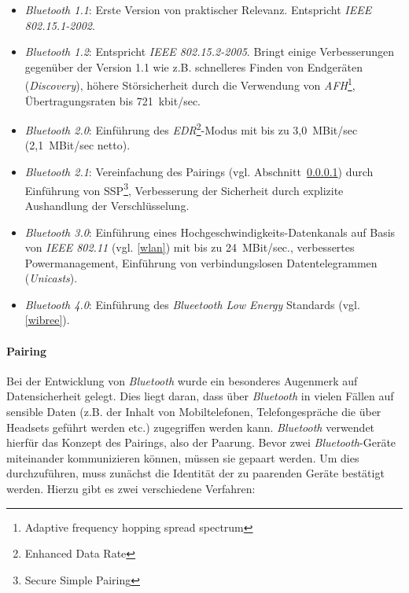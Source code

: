                 \begin{itemize}
                    \item{\emph{Bluetooth 1.1}:} Erste Version von praktischer Relevanz. Entspricht 
                                          \emph{IEEE 802.15.1-2002}.
                    \item{\emph{Bluetooth 1.2}:} Entspricht \emph{IEEE 802.15.2-2005}. Bringt einige Verbesserungen
                                          gegenüber der Version 1.1 wie z.B. schnelleres Finden
                                          von Endgeräten (\emph{Discovery}), höhere Störsicherheit durch
                                          die Verwendung von \emph{AFH}\footnote{Adaptive frequency hopping spread spectrum},
                                          Übertragungsraten bis 721~kbit/sec.
                    \item{\emph{Bluetooth 2.0}:} Einführung des \emph{EDR}\footnote{Enhanced Data Rate}-Modus mit bis zu
                                          3,0~MBit/sec (2,1~MBit/sec netto).
                    \item{\emph{Bluetooth 2.1}:} Vereinfachung des Pairings (vgl. Abschnitt~\ref{BluetoothPairing}) durch 
                                          Einführung von SSP\footnote{Secure Simple Pairing}, Verbesserung
                                          der Sicherheit durch explizite Aushandlung der Verschlüsselung.
                    \item{\emph{Bluetooth 3.0}:} Einführung eines Hochgeschwindigkeits-Datenkanals auf Basis von
                                          \emph{IEEE 802.11} (vgl. \ref{wlan}) mit bis zu 24~MBit/sec., verbessertes
                                          Powermanagement, Einführung von verbindungslosen Datentelegrammen
                                          (\emph{Unicasts}).
                    \item{\emph{Bluetooth 4.0}:} Einführung des \textsl{Blueetooth Low Energy} Standards (vgl. \ref{wibree}).
                \end{itemize}

            \paragraph{Pairing}\label{BluetoothPairing}
                Bei der Entwicklung von \emph{Bluetooth} wurde ein besonderes Augenmerk auf Datensicherheit gelegt. 
                Dies liegt daran, dass über \emph{Bluetooth} in vielen Fällen auf sensible Daten (z.B. der Inhalt
                von Mobiltelefonen, Telefongespräche die über Headsets geführt werden etc.) zugegriffen
                werden kann. \emph{Bluetooth} verwendet hierfür das Konzept des Pairings, also der Paarung. Bevor zwei 
                \emph{Bluetooth}-Geräte miteinander kommunizieren können, müssen sie gepaart werden. Um dies 
                durchzuführen, muss zunächst die Identität der zu paarenden Geräte bestätigt werden.
                Hierzu gibt es zwei verschiedene Verfahren:


